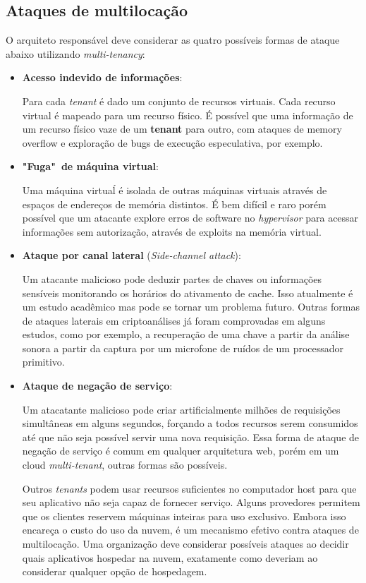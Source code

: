 \subsection{Ataques de multilocação}
O arquiteto responsável deve considerar as quatro possíveis formas de ataque abaixo utilizando \textit{multi-tenancy}:
\begin{itemize}
	\item
	\textbf{Acesso indevido de informações}: 

	Para cada \textit{tenant} é dado um conjunto de recursos virtuais. Cada recurso virtual é mapeado para um recurso físico. É possível que uma informação de um recurso físico vaze de um \textbf{tenant} para outro, com ataques de memory overflow e exploração de bugs de execução especulativa, por exemplo.

	\item
	\textbf{"Fuga"~de máquina virtual}: 

	Uma máquina virtuaĺ é isolada de outras máquinas virtuais através de espaços de endereços de memória distintos. É bem difícil e raro porém possível que um atacante explore erros de software no \textit{hypervisor} para acessar informações sem autorização, através de exploits na memória virtual.

	\item
	\textbf{Ataque por canal lateral } (\textit{Side-channel attack}): 

	Um atacante malicioso pode deduzir partes de chaves ou informações sensíveis monitorando os horários do ativamento de cache. Isso atualmente é um estudo acadêmico mas pode se tornar um problema futuro. Outras formas de ataques laterais em criptoanálises já foram comprovadas em alguns estudos, como por exemplo, a recuperação de uma chave a partir da análise sonora a partir da captura por um microfone de ruídos de um processador primitivo. 

	\item
	\textbf{Ataque de negação de serviço}:

	Um atacatante malicioso pode criar artificialmente milhões de requisições simultâneas em alguns segundos, forçando a todos recursos serem consumidos até que não seja possível servir uma nova requisição. Essa forma de ataque de negação de serviço é comum em qualquer arquitetura web, porém em um cloud \textit{multi-tenant}, outras formas são possíveis.

	Outros \textit{tenants} podem usar recursos suficientes no computador host para que seu aplicativo não seja capaz de fornecer serviço. Alguns provedores permitem que os clientes reservem máquinas inteiras para uso exclusivo. Embora isso encareça o custo do uso da nuvem, é um mecanismo efetivo contra ataques de multilocação. Uma organização deve considerar possíveis ataques ao decidir quais aplicativos hospedar na nuvem, exatamente como deveriam ao considerar qualquer opção de hospedagem.
\end{itemize}